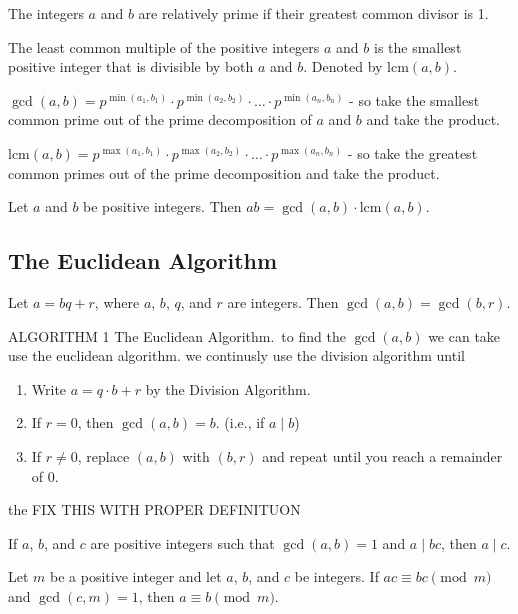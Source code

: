 \documentclass{article}
\begin{document}
\begin{definition}
    The integers \( a \) and \( b \) are relatively prime if their greatest common divisor is 1.
\end{definition}

\begin{definition}
    The least common multiple of the positive integers \( a \) and \( b \) is the smallest positive integer that is divisible by both \( a \) and \( b \). 
    Denoted by \( \text{lcm}(a, b) \).
\end{definition}

\begin{theorem}
    \( \gcd(a, b) = p^{\min(a_1, b_1)} \cdot p^{\min(a_2, b_2)} \cdot \ldots \cdot p^{\min(a_n, b_n)} \) - 
    so take the smallest common prime out of the prime decomposition of \( a \) and \( b \) and take the product.
\end{theorem}

\begin{theorem}
    \( \text{lcm}(a, b) = p^{\max(a_1, b_1)} \cdot p^{\max(a_2, b_2)} \cdot \ldots \cdot p^{\max(a_n, b_n)} \)
     - so take the greatest common primes out of the prime decomposition and take the product.
\end{theorem}

\begin{theorem}
    Let \( a \) and \( b \) be positive integers. Then \( ab = \gcd(a, b) \cdot \text{lcm}(a, b) \).
\end{theorem}

\subsection{The Euclidean Algorithm}
\begin{theorem}
    Let \( a = bq + r \), where \(a \), \(b \), \(q \), and \(r \) are integers. Then \( \gcd(a, b) = \gcd(b, r)\).
\end{theorem}
\begin{theorem}
    ALGORITHM 1 The Euclidean Algorithm.\
    to find the \( \gcd(a, b)\) we can take use the euclidean algorithm. we continusly use the division algorithm until
    \begin{enumerate}
        \item Write \( a = q \cdot b + r \) by the Division Algorithm.
        \item If \( r = 0 \), then \( \gcd(a,b) = b \). (i.e., if \( a \mid b \))
        \item If \( r \neq 0 \), replace \( (a,b) \) with \( (b,r) \) and repeat until you reach a remainder of 0.
    \end{enumerate}    
    the FIX THIS WITH PROPER DEFINITUON
\end{theorem}
\begin{theorem}
    If \(a \), \(b \), and \(c \) are positive integers such that \( \gcd(a,b) = 1\) and \(a \mid bc\), then \(a \mid c \).
\end{theorem}
\begin{theorem}
    Let \( m \) be a positive integer and let \( a \), \( b \), and \( c \) be integers. If \( ac \equiv bc \pmod{m} \) and \( \gcd(c,m) = 1 \), then \( a \equiv b \pmod{m}. \)
\end{theorem}
\end{document}
